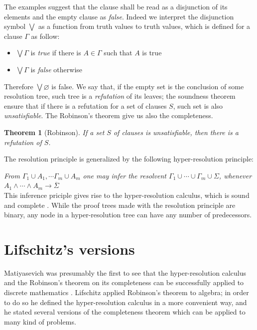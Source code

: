 \documentclass[a4paper,12pt,oneside]{book}
\newtheorem{theorem}{Theorem}[chapter]
\let\emptyset\varnothing
\let\e\wedge
\begin{document}
The examples suggest that the clause shall be read as a disjunction of its elements and the empty clause as \textit{false}. Indeed we interpret the disjunction symbol $\bigvee$ as a function from truth values to truth values, which is defined for a clause $\Gamma$ as follow:
\begin{itemize}
\item $\bigvee \Gamma$ is  \textit{true} if there is $A\in\Gamma$ such that $A$ is true
\item  $\bigvee \Gamma$ is \textit{false} otherwise
\end{itemize}
Therefore $\bigvee\emptyset$ is false. We say that, if the empty set is the conclusion of some resolution tree, such tree is a \textit{refutation} of its leaves; the soundness theorem ensure that if there is a refutation for a set of clauses $S$, such set is also \textit{unsatisfiable}. The Robinson's theorem \cite{robinson} give us also the completeness.
\begin{theorem}[Robinson]\label{originalRob}
If a set $S$ of clauses is unsatisfiable, then there is a refutation of $S$.
\end{theorem}

\newpage\noindent
The resolution principle is generalized by the following hyper-resolution principle:

\textit{From $\Gamma_1\cup A_1,\cdots\Gamma_m\cup A_m $ one may infer the resolvent $\Gamma_1\cup\cdots\cup\Gamma_m\cup \Sigma$, whenever $A_1\e\cdots\e A_m\rightarrow \overline{\Sigma}$}\\  
This inference priciple gives rise to the hyper-resolution calculus, which is sound and complete \cite{rob,robinson-general}. While the proof trees made with the resolution principle are binary, any node in a hyper-resolution tree can have any number of predecessors.


\section{Lifschitz's versions}
Matiyasevich was presumably the first to see that the hyper-resolution calculus and the Robinson's theorem on its completeness can be successfully applied to discrete mathematics \cite{mat-1,mat-2}. Lifschitz applied Robinson's theorem to algebra\cite{lifschitz}; in order to do so  he defined the hyper-resolution calculus in a more convenient way, and he stated several versions of the completeness theorem which can be applied to many kind of problems.
\end{document}
